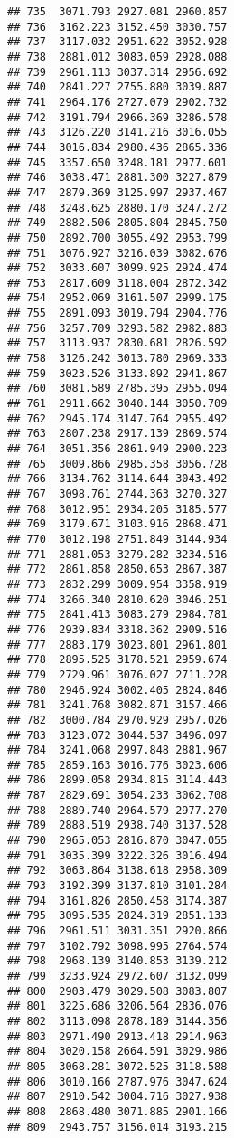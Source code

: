 \documentclass[
]{article}
\begin{document}
\begin{verbatim}
## 735  3071.793 2927.081 2960.857
## 736  3162.223 3152.450 3030.757
## 737  3117.032 2951.622 3052.928
## 738  2881.012 3083.059 2928.088
## 739  2961.113 3037.314 2956.692
## 740  2841.227 2755.880 3039.887
## 741  2964.176 2727.079 2902.732
## 742  3191.794 2966.369 3286.578
## 743  3126.220 3141.216 3016.055
## 744  3016.834 2980.436 2865.336
## 745  3357.650 3248.181 2977.601
## 746  3038.471 2881.300 3227.879
## 747  2879.369 3125.997 2937.467
## 748  3248.625 2880.170 3247.272
## 749  2882.506 2805.804 2845.750
## 750  2892.700 3055.492 2953.799
## 751  3076.927 3216.039 3082.676
## 752  3033.607 3099.925 2924.474
## 753  2817.609 3118.004 2872.342
## 754  2952.069 3161.507 2999.175
## 755  2891.093 3019.794 2904.776
## 756  3257.709 3293.582 2982.883
## 757  3113.937 2830.681 2826.592
## 758  3126.242 3013.780 2969.333
## 759  3023.526 3133.892 2941.867
## 760  3081.589 2785.395 2955.094
## 761  2911.662 3040.144 3050.709
## 762  2945.174 3147.764 2955.492
## 763  2807.238 2917.139 2869.574
## 764  3051.356 2861.949 2900.223
## 765  3009.866 2985.358 3056.728
## 766  3134.762 3114.644 3043.492
## 767  3098.761 2744.363 3270.327
## 768  3012.951 2934.205 3185.577
## 769  3179.671 3103.916 2868.471
## 770  3012.198 2751.849 3144.934
## 771  2881.053 3279.282 3234.516
## 772  2861.858 2850.653 2867.387
## 773  2832.299 3009.954 3358.919
## 774  3266.340 2810.620 3046.251
## 775  2841.413 3083.279 2984.781
## 776  2939.834 3318.362 2909.516
## 777  2883.179 3023.801 2961.801
## 778  2895.525 3178.521 2959.674
## 779  2729.961 3076.027 2711.228
## 780  2946.924 3002.405 2824.846
## 781  3241.768 3082.871 3157.466
## 782  3000.784 2970.929 2957.026
## 783  3123.072 3044.537 3496.097
## 784  3241.068 2997.848 2881.967
## 785  2859.163 3016.776 3023.606
## 786  2899.058 2934.815 3114.443
## 787  2829.691 3054.233 3062.708
## 788  2889.740 2964.579 2977.270
## 789  2888.519 2938.740 3137.528
## 790  2965.053 2816.870 3047.055
## 791  3035.399 3222.326 3016.494
## 792  3063.864 3138.618 2958.309
## 793  3192.399 3137.810 3101.284
## 794  3161.826 2850.458 3174.387
## 795  3095.535 2824.319 2851.133
## 796  2961.511 3031.351 2920.866
## 797  3102.792 3098.995 2764.574
## 798  2968.139 3140.853 3139.212
## 799  3233.924 2972.607 3132.099
## 800  2903.479 3029.508 3083.807
## 801  3225.686 3206.564 2836.076
## 802  3113.098 2878.189 3144.356
## 803  2971.490 2913.418 2914.963
## 804  3020.158 2664.591 3029.986
## 805  3068.281 3072.525 3118.588
## 806  3010.166 2787.976 3047.624
## 807  2910.542 3004.716 3027.938
## 808  2868.480 3071.885 2901.166
## 809  2943.757 3156.014 3193.215

\end{verbatim}
\end{document}
